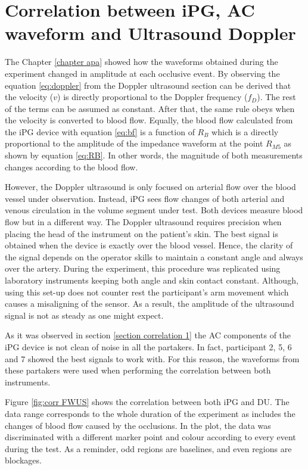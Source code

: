 \section{Correlation between iPG, AC waveform and Ultrasound Doppler} %
\label{section correlation 2} 
The Chapter \ref{chapter apa} showed how the waveforms obtained during the experiment changed in amplitude at each occlusive event. By observing the equation \ref{eq:doppler}  from the Doppler ultrasound section can be derived that the velocity ($v$) is directly proportional to the Doppler frequency ($f_D$). The rest of the terms can be assumed as constant. After that, the same rule obeys when the velocity is converted to blood flow. Equally, the blood flow calculated from the iPG device with equation \ref{eq:bf} is a function of $R_B$ which is a directly proportional to the amplitude of the impedance waveform at the point $R_{M5}$ as shown by equation \ref{eq:RB}. In other words, the magnitude of both measurements changes according to the blood flow.

However, the Doppler ultrasound is only focused on arterial flow over the blood vessel under observation. Instead, iPG sees flow changes of both arterial and venous circulation in the volume segment under test. Both devices measure blood flow but in a different way. The Doppler ultrasound requires precision when placing the head of the instrument on the patient's skin. The best signal is obtained when the device is exactly over the blood vessel. Hence, the clarity of the signal depends on the operator skills to maintain a constant angle and always over the artery. During the experiment, this procedure was replicated using laboratory instruments keeping both angle and skin contact constant. Although, using this set-up does not counter rest the participant's arm movement which causes a misaligning of the sensor. As a result, the amplitude of the ultrasound signal is not as steady as one might expect. 

As it was observed in section \ref{section correlation 1} the AC components of the iPG device is not clean of noise in all the partakers. In fact, participant 2, 5, 6 and 7 showed the best signals to work with. For this reason, the waveforms from these partakers were used when performing the correlation between both instruments. 

Figure \ref{fig:corr FWUS} shows the correlation between both iPG and DU. The data range corresponds to the whole duration of the experiment as includes the changes of blood flow caused by the occlusions. In the plot, the data was discriminated with a different marker point and colour according to every event during the test. As a reminder, odd regions are baselines, and even regions are blockages.  

